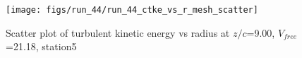 \begin{figure}[H]
\centering
\texttt{[image: figs/run\_44/run\_44\_ctke\_vs\_r\_mesh\_scatter]}
\caption{Scatter plot of turbulent kinetic energy vs radius at $z/c$=9.00, $V_{free}$=21.18, station5}
\label{fig:run_44_ctke_vs_r_mesh_scatter}
\end{figure}



